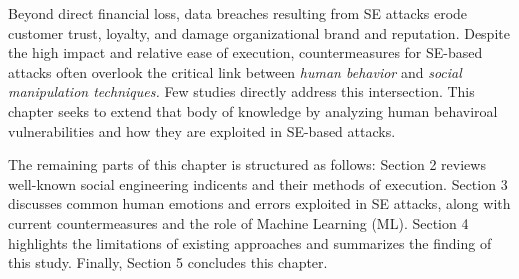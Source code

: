Beyond direct financial loss, data breaches resulting from SE attacks erode customer trust, loyalty, and damage organizational brand and reputation. Despite the high impact and relative ease of execution, countermeasures for SE-based attacks often overlook the critical link between \textit{human behavior} and \textit{social manipulation techniques.} Few studies directly address this intersection. This chapter seeks to extend that body of knowledge by analyzing human behaviroal vulnerabilities and how they are exploited in SE-based attacks.

The remaining parts of this chapter is structured as follows: Section 2 reviews well-known social engineering indicents and their methods of execution. Section 3 discusses common human emotions and errors exploited in SE attacks, along with current countermeasures and the role of Machine Learning (ML). Section 4 highlights the limitations of existing approaches and summarizes the finding of this study. Finally, Section  5 concludes this chapter.

